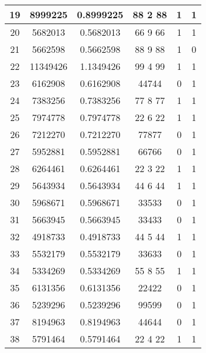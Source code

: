 \documentclass{jlreq}
\numberwithin{equation}{section}
\begin{document}
\begin{table}[H]
{\begin{tabular}{|c|c|c|c|c|c|}
      19           & 8999225          & 0.8999225      & 88   2   88 & 1     & 1   \\ \hline
      20           & 5682013          & 0.5682013      & 66   9   66 & 1     & 1   \\ \hline
      21           & 5662598          & 0.5662598      & 88   9   88 & 1     & 0   \\ \hline
      22           & 11349426         & 1.1349426      & 99   4   99 & 1     & 1   \\ \hline
      23           & 6162908          & 0.6162908      & 44744       & 0     & 1   \\ \hline
      24           & 7383256          & 0.7383256      & 77   8   77 & 1     & 1   \\ \hline
      25           & 7974778          & 0.7974778      & 22   6   22 & 1     & 1   \\ \hline
      26           & 7212270          & 0.7212270      & 77877       & 0     & 1   \\ \hline
      27           & 5952881          & 0.5952881      & 66766       & 0     & 1   \\ \hline
      28           & 6264461          & 0.6264461      & 22   3   22 & 1     & 1   \\ \hline
      29           & 5643934          & 0.5643934      & 44   6   44 & 1     & 1   \\ \hline
      30           & 5968671          & 0.5968671      & 33533       & 0     & 1   \\ \hline
      31           & 5663945          & 0.5663945      & 33433       & 0     & 1   \\ \hline
      32           & 4918733          & 0.4918733      & 44   5   44 & 1     & 1   \\ \hline
      33           & 5532179          & 0.5532179      & 33633       & 0     & 1   \\ \hline
      34           & 5334269          & 0.5334269      & 55   8   55 & 1     & 1   \\ \hline
      35           & 6131356          & 0.6131356      & 22422       & 0     & 1   \\ \hline
      36           & 5239296          & 0.5239296      & 99599       & 0     & 1   \\ \hline
      37           & 8194963          & 0.8194963      & 44644       & 0     & 1   \\ \hline
      38           & 5791464          & 0.5791464      & 22   4   22 & 1     & 1   \\ \hline

\end{tabular}}
\end{table}
\end{document}
